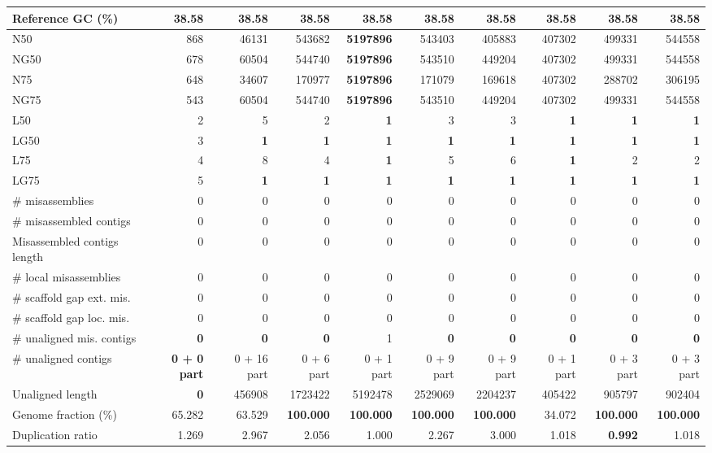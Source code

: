 \documentclass[12pt,a4paper]{article}
\begin{document}
\begin{table}[ht]
\begin{center}
\begin{tabular}{|l*{9}{|r}|}
Reference GC (\%) & 38.58 & 38.58 & 38.58 & 38.58 & 38.58 & 38.58 & 38.58 & 38.58 & 38.58 \\ \hline
N50 & 868 & 46131 & 543682 & {\bf 5197896} & 543403 & 405883 & 407302 & 499331 & 544558 \\ \hline
NG50 & 678 & 60504 & 544740 & {\bf 5197896} & 543510 & 449204 & 407302 & 499331 & 544558 \\ \hline
N75 & 648 & 34607 & 170977 & {\bf 5197896} & 171079 & 169618 & 407302 & 288702 & 306195 \\ \hline
NG75 & 543 & 60504 & 544740 & {\bf 5197896} & 543510 & 449204 & 407302 & 499331 & 544558 \\ \hline
L50 & 2 & 5 & 2 & {\bf 1} & 3 & 3 & {\bf 1} & {\bf 1} & {\bf 1} \\ \hline
LG50 & 3 & {\bf 1} & {\bf 1} & {\bf 1} & {\bf 1} & {\bf 1} & {\bf 1} & {\bf 1} & {\bf 1} \\ \hline
L75 & 4 & 8 & 4 & {\bf 1} & 5 & 6 & {\bf 1} & 2 & 2 \\ \hline
LG75 & 5 & {\bf 1} & {\bf 1} & {\bf 1} & {\bf 1} & {\bf 1} & {\bf 1} & {\bf 1} & {\bf 1} \\ \hline
\# misassemblies & 0 & 0 & 0 & 0 & 0 & 0 & 0 & 0 & 0 \\ \hline
\# misassembled contigs & 0 & 0 & 0 & 0 & 0 & 0 & 0 & 0 & 0 \\ \hline
Misassembled contigs length & 0 & 0 & 0 & 0 & 0 & 0 & 0 & 0 & 0 \\ \hline
\# local misassemblies & 0 & 0 & 0 & 0 & 0 & 0 & 0 & 0 & 0 \\ \hline
\# scaffold gap ext. mis. & 0 & 0 & 0 & 0 & 0 & 0 & 0 & 0 & 0 \\ \hline
\# scaffold gap loc. mis. & 0 & 0 & 0 & 0 & 0 & 0 & 0 & 0 & 0 \\ \hline
\# unaligned mis. contigs & {\bf 0} & {\bf 0} & {\bf 0} & 1 & {\bf 0} & {\bf 0} & {\bf 0} & {\bf 0} & {\bf 0} \\ \hline
\# unaligned contigs & {\bf 0 + 0 part} & 0 + 16 part & 0 + 6 part & 0 + 1 part & 0 + 9 part & 0 + 9 part & 0 + 1 part & 0 + 3 part & 0 + 3 part \\ \hline
Unaligned length & {\bf 0} & 456908 & 1723422 & 5192478 & 2529069 & 2204237 & 405422 & 905797 & 902404 \\ \hline
Genome fraction (\%) & 65.282 & 63.529 & {\bf 100.000} & {\bf 100.000} & {\bf 100.000} & {\bf 100.000} & 34.072 & {\bf 100.000} & {\bf 100.000} \\ \hline
Duplication ratio & 1.269 & 2.967 & 2.056 & 1.000 & 2.267 & 3.000 & 1.018 & {\bf 0.992} & 1.018 \\ \hline

\end{tabular}
\end{center}
\end{table}
\end{document}
